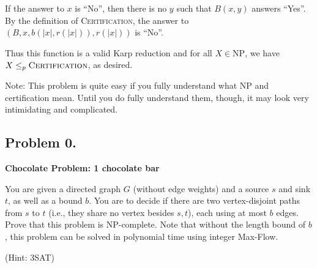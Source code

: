 \documentclass[10pt]{article}
\begin{document}
\begin{enumerate}
If the answer to \(x\) is ``No'', then there is no \(y\) such that \(B(x, y)\) answers ``Yes''. By the definition of \textsc{Certification}, the answer to \((B, x, b(|x|, r(|x|)), r(|x|))\) is ``No''.

Thus this function is a valid Karp reduction and for all $X \in \text{NP}$, we have $X \leq_p \text{\textsc{Certification}}$, as desired.

\end{enumerate}

Note: This problem is quite easy if you fully understand what NP and certification mean. Until you do fully understand them, though, it may look very intimidating and complicated.

\subsection*{Problem 0.}
\textbf{Chocolate Problem: 1 chocolate bar}

You are given a directed graph $G$ (without edge weights) and a source
$s$ and sink $t$, as well as a bound $b$.
You are to decide if there are two vertex-disjoint paths from $s$ to
$t$ (i.e., they share no vertex besides $s, t$),
each using at most $b$ edges.
Prove that this problem is NP-complete.
Note that without the length bound of $b$, this problem can be solved
in polynomial time using integer Max-Flow.

(Hint: 3SAT)
\end{document}
